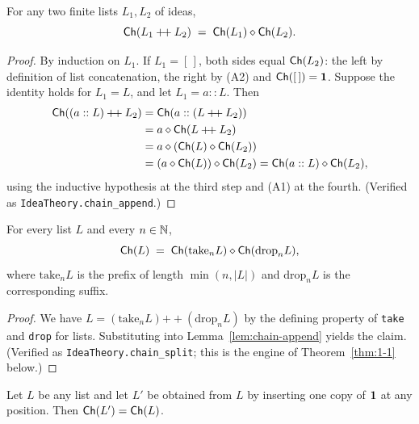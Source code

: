 \begin{lemma}\label{lem:chain-append}
For any two finite lists $L_1, L_2$ of ideas,
\begin{equation}\label{eq:chain-append}
\mathsf{Ch}(L_1 \mathbin{+\!+} L_2) \;=\; \mathsf{Ch}(L_1) \mathbin{\diamond} \mathsf{Ch}(L_2).
\end{equation}
\end{lemma}

\begin{proof}
By induction on $L_1$.  If $L_1 = [\,]$, both sides equal $\mathsf{Ch}(L_2)$:
the left by definition of list concatenation, the right by (A2) and
$\mathsf{Ch}([\,]) = \mathbf{1}$.  Suppose the identity holds for $L_1 = L$, and let
$L_1 = a :: L$.  Then
\begin{align*}
\mathsf{Ch}((a :: L) \mathbin{+\!+} L_2)
&= \mathsf{Ch}(a :: (L \mathbin{+\!+} L_2)) \\
&= a \mathbin{\diamond} \mathsf{Ch}(L \mathbin{+\!+} L_2) \\
&= a \mathbin{\diamond} (\mathsf{Ch}(L) \mathbin{\diamond} \mathsf{Ch}(L_2)) \\
&= (a \mathbin{\diamond} \mathsf{Ch}(L)) \mathbin{\diamond} \mathsf{Ch}(L_2)
 = \mathsf{Ch}(a :: L) \mathbin{\diamond} \mathsf{Ch}(L_2),
\end{align*}
using the inductive hypothesis at the third step and (A1) at the fourth.
(Verified as \texttt{IdeaTheory.chain\_append}.)
\end{proof}

\begin{lemma}\label{lem:chain-split}
For every list $L$ and every $n \in \mathbb{N}$,
\begin{equation}\label{eq:chain-split}
\mathsf{Ch}(L) \;=\; \mathsf{Ch}(\mathrm{take}_n L) \mathbin{\diamond} \mathsf{Ch}(\mathrm{drop}_n L),
\end{equation}
where $\mathrm{take}_n L$ is the prefix of length $\min(n, |L|)$ and
$\mathrm{drop}_n L$ is the corresponding suffix.
\end{lemma}

\begin{proof}
We have $L = (\mathrm{take}_n L) \mathbin{+\!+} (\mathrm{drop}_n L)$ by the
defining property of \texttt{take} and \texttt{drop} for lists.
Substituting into Lemma~\ref{lem:chain-append} yields the claim.
(Verified as \texttt{IdeaTheory.chain\_split}; this is the engine of
Theorem~\ref{thm:1-1} below.)
\end{proof}

\begin{lemma}\label{lem:chain-pad}
Let $L$ be any list and let $L'$ be obtained from $L$ by inserting one
copy of $\mathbf{1}$ at any position.  Then $\mathsf{Ch}(L') = \mathsf{Ch}(L)$.
\end{lemma}

